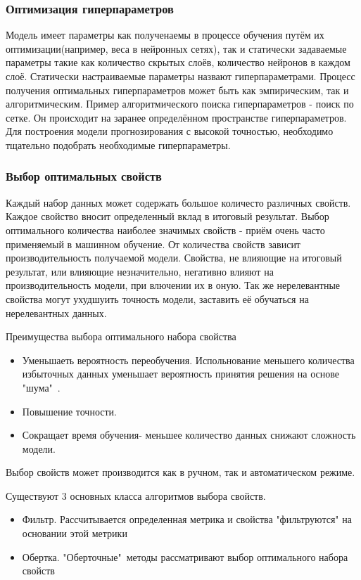 \subsubsection{Оптимизация гиперпараметров}
Модель имеет параметры как полученаемы в процессе обучения путём их оптимизации(например, веса в нейронных сетях), так и статически задаваемые параметры такие как количество скрытых слоёв, количество нейронов в каждом слоё. Статически настраиваемые параметры назвают гиперпараметрами. Процесс получения оптимальных гиперпараметров может быть как эмпирическим, так и алгоритмическим. Пример алгоритмического поиска гиперпараметров - поиск по сетке. Он происходит на заранее определённом пространстве гиперпараметров. Для построения модели прогнозирования с высокой точностью, необходимо тщательно подобрать необходимые гиперпараметры.

\subsubsection{Выбор оптимальных свойств}
Каждый набор данных может содержать большое количесто различных свойств. Каждое свойство вносит определенный вклад в итоговый результат. Выбор оптимального количества наиболее значимых свойств - приём очень часто применяемый в машинном обучение. От количества свойств зависит производительность получаемой модели. Свойства, не влияющие на итоговый результат, или влияющие незначительно, негативно влияют на производительность модели, при влючении их в оную. Так же нерелевантные свойства могут ухудшуить точность модели, заставить её обучаться на нерелевантных данных\cite{Book14}.

Преимущества выбора оптимального набора свойства
\begin{itemize}
	\item Уменьшаеть вероятность переобучения. Испольнование меньшего количества избыточных данных уменьшает вероятность принятия решения на основе "шума"\ .
	\item Повышение точности.
	\item Сокращает время обучения- меньшее количество данных снижают сложность модели.
\end{itemize}
Выбор свойств может производится как в ручном, так и автоматическом режиме.

Существуют 3 основных класса алгоритмов выбора свойств.
\begin{itemize}
\item Фильтр. Рассчитывается определенная метрика и свойства "фильтруются" на основании этой метрики
\item Обертка. "Оберточные"\ методы рассматривают выбор оптимального набора свойств
\end{itemize}


